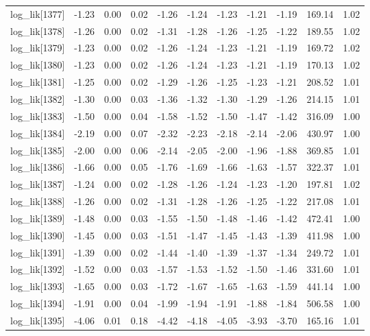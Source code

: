 \begin{table}[ht]
\begin{tabular}{rrrrrrrrrrr}
  log\_lik[1377] & -1.23 & 0.00 & 0.02 & -1.26 & -1.24 & -1.23 & -1.21 & -1.19 & 169.14 & 1.02 \\ 
  log\_lik[1378] & -1.26 & 0.00 & 0.02 & -1.31 & -1.28 & -1.26 & -1.25 & -1.22 & 189.55 & 1.02 \\ 
  log\_lik[1379] & -1.23 & 0.00 & 0.02 & -1.26 & -1.24 & -1.23 & -1.21 & -1.19 & 169.72 & 1.02 \\ 
  log\_lik[1380] & -1.23 & 0.00 & 0.02 & -1.26 & -1.24 & -1.23 & -1.21 & -1.19 & 170.13 & 1.02 \\ 
  log\_lik[1381] & -1.25 & 0.00 & 0.02 & -1.29 & -1.26 & -1.25 & -1.23 & -1.21 & 208.52 & 1.01 \\ 
  log\_lik[1382] & -1.30 & 0.00 & 0.03 & -1.36 & -1.32 & -1.30 & -1.29 & -1.26 & 214.15 & 1.01 \\ 
  log\_lik[1383] & -1.50 & 0.00 & 0.04 & -1.58 & -1.52 & -1.50 & -1.47 & -1.42 & 316.09 & 1.00 \\ 
  log\_lik[1384] & -2.19 & 0.00 & 0.07 & -2.32 & -2.23 & -2.18 & -2.14 & -2.06 & 430.97 & 1.00 \\ 
  log\_lik[1385] & -2.00 & 0.00 & 0.06 & -2.14 & -2.05 & -2.00 & -1.96 & -1.88 & 369.85 & 1.01 \\ 
  log\_lik[1386] & -1.66 & 0.00 & 0.05 & -1.76 & -1.69 & -1.66 & -1.63 & -1.57 & 322.37 & 1.01 \\ 
  log\_lik[1387] & -1.24 & 0.00 & 0.02 & -1.28 & -1.26 & -1.24 & -1.23 & -1.20 & 197.81 & 1.02 \\ 
  log\_lik[1388] & -1.26 & 0.00 & 0.02 & -1.31 & -1.28 & -1.26 & -1.25 & -1.22 & 217.08 & 1.01 \\ 
  log\_lik[1389] & -1.48 & 0.00 & 0.03 & -1.55 & -1.50 & -1.48 & -1.46 & -1.42 & 472.41 & 1.00 \\ 
  log\_lik[1390] & -1.45 & 0.00 & 0.03 & -1.51 & -1.47 & -1.45 & -1.43 & -1.39 & 411.98 & 1.00 \\ 
  log\_lik[1391] & -1.39 & 0.00 & 0.02 & -1.44 & -1.40 & -1.39 & -1.37 & -1.34 & 249.72 & 1.01 \\ 
  log\_lik[1392] & -1.52 & 0.00 & 0.03 & -1.57 & -1.53 & -1.52 & -1.50 & -1.46 & 331.60 & 1.01 \\ 
  log\_lik[1393] & -1.65 & 0.00 & 0.03 & -1.72 & -1.67 & -1.65 & -1.63 & -1.59 & 441.14 & 1.00 \\ 
  log\_lik[1394] & -1.91 & 0.00 & 0.04 & -1.99 & -1.94 & -1.91 & -1.88 & -1.84 & 506.58 & 1.00 \\ 
  log\_lik[1395] & -4.06 & 0.01 & 0.18 & -4.42 & -4.18 & -4.05 & -3.93 & -3.70 & 165.16 & 1.01 \\ 

\end{tabular}
\end{table}
